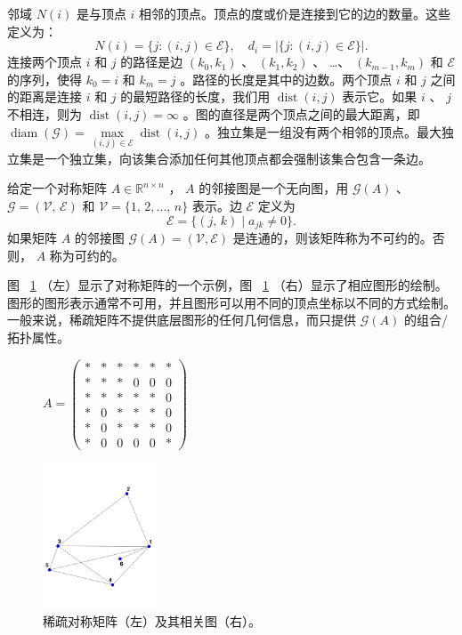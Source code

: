 \documentclass[12pt]{acta_2011xz}
\begin{document}
邻域    $N(i)$    是与顶点    $i$    相邻的顶点。顶点的度或价是连接到它的边的数量。这些定义为：
   \begin{equation}\label{ni-di}
    N(i)= \{ j: (i, j)\in \mathcal E \} ,\quad    d_i=| \{ j: (i, j)\in \mathcal E \} |. 
\end{equation}    连接两个顶点    $i$    和    $j$    的路径是边    $(k_0, k_1)$    、   $(k_1, k_2)$    、   \ldots    、   $(k_{m-1}, k_m)$    和
   $\mathcal E$    的序列，使得    $k_0=i$    和    $k_m=j$    。路径的长度是其中的边数。两个顶点
   $i$    和    $j$    之间的距离是连接    $i$    和    $j$    的最短路径的长度，我们用    $\operatorname{dist}(i, j)$    表示它。如果    $i$    、    $j$    不相连，则为    $\operatorname{dist}(i, j)=\infty$    。图的直径是两个顶点之间的最大距离，即
   $\operatorname{diam}(\mathcal G) = \max\limits_{(i, j)\in \mathcal
  E}\operatorname{dist}(i, j)$    。独立集是一组没有两个相邻的顶点。最大独立集是一个独立集，向该集合添加任何其他顶点都会强制该集合包含一条边。  

给定一个对称矩阵    $A \in \mathbb{R}^{n\times n}$    ，    $A$    的邻接图是一个无向图，用
   $\mathcal{G}(A)$    、    $\mathcal{G}= (\mathcal{V}, \,\mathcal{E})$    和
   $\mathcal{V}= \{ 1, \,2, ..., \,n \} $    表示。边    $\mathcal{E}$    定义为
   \[
\mathcal{E} =  \{ (j,\,k)\;\big|\; a_{jk} \ne 0 \} . 
\]    如果矩阵    $A$    的邻接图
   $\mathcal G(A) = (\mathcal V, \mathcal E)$    是连通的，则该矩阵称为不可约的。否则，
   $A$    称为可约的。  

图~    \ref{fig:graph-and-matrix}   （左）显示了对称矩阵的一个示例，图~    \ref{fig:graph-and-matrix}   （右）显示了相应图形的绘制。图形的图形表示通常不可用，并且图形可以用不同的顶点坐标以不同的方式绘制。一般来说，稀疏矩阵不提供底层图形的任何几何信息，而只提供    $\mathcal{G}(A)$    的组合/拓扑属性。  

   \begin{figure}[!htbp]
\begin{center}
\parbox{0.35\textwidth}{        $
A=\begin{pmatrix}
      * & * & * & * & * & *  \\ 
      * & * & * & 0 & 0 & 0  \\ 
      * & * & * & * & * &  0  \\ 
      * & 0 & * & * & * & 0 \\ 
      * & 0 & * & * & * & 0 \\ 
      * & 0 & 0 & 0 & 0 & *   
\end{pmatrix}$        }
\parbox{0.35\textwidth}{\includegraphics*[width=0.3\textwidth]{graph1}}
\end{center}
\caption{稀疏对称矩阵（左）及其相关图（右）。   \label{fig:graph-and-matrix}     }
\end{figure}     
\end{document}
